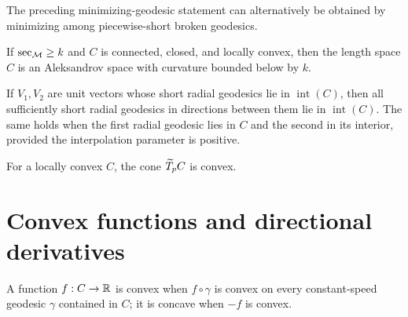 \begin{remark}
\label{rem:chow-iii-h16-locally-convex-length-space}
The preceding minimizing-geodesic statement can alternatively be obtained by
minimizing among piecewise-short broken geodesics.
\end{remark}

\begin{proposition}
\label{prop:chow-iii-h17-aleksandrov-subset}
If $\sec_{\mathcal M}\ge k$ and $C$ is connected, closed, and locally convex, then the
length space $C$ is an Aleksandrov space with curvature bounded below by $k$.
\end{proposition}

\begin{lemma}
\label{lem:chow-iii-h18-infinitesimal-convexity}
If $V_1,V_2$ are unit vectors whose short radial geodesics lie in $\operatorname{int}(C)$,
then all sufficiently short radial geodesics in directions between them lie in
$\operatorname{int}(C)$.  The same holds when the first radial geodesic lies in $C$
and the second in its interior, provided the interpolation parameter is positive.
\end{lemma}

\begin{corollary}
\label{cor:chow-iii-h19-interior-tangent-cone-convex}
For a locally convex $C$, the cone $\widetilde T_pC$ is convex.
\end{corollary}

\section{Convex functions and directional derivatives}

\begin{definition}
\label{def:chow-iii-h20-convex-function}
A function $f:C\to\mathbb R$ is convex when $f\circ\gamma$ is convex on every constant-speed
geodesic $\gamma$ contained in $C$; it is concave when $-f$ is convex.
\end{definition}

